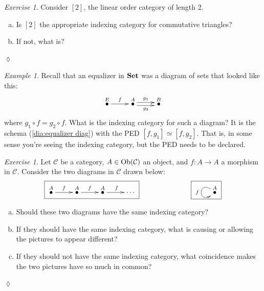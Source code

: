 \documentclass{book}
\def\tn{\textnormal}
\def\mc{\mathcal}
\def\Ob{\tn{Ob}}
\def\to{\rightarrow}
\def\taking{\colon}
\newcommand{\LMO}[1]{\stackrel{#1}{\bullet}}
\def\Set{{\bf Set}}
\def\mcC{\mc{C}}
\theoremstyle{remark}
\newtheorem{example}[subsubsection]{Example}
\newtheorem{exc}[subsubsection]{Exercise}
\newenvironment{exercise}{\begin{exc}}{\hspace*{\fill}$\lozenge$\end{exc}}
\theoremstyle{definition}
\def\sexc{\begin{enumerate}[a.)]\setlength{\itemsep}{.1cm}\setlength{\parskip}{.1cm}\item}
\def\next{\item}
\def\endsexc{\end{enumerate}}
\begin{document}
\begin{exercise}
Consider $[2]$, the linear order category of length 2.
\sexc Is $[2]$ the appropriate indexing category for commutative triangles?
\next If not, what is?
\endsexc
\end{exercise}

\begin{example}

Recall that an equalizer in $\Set$ was a diagram of sets that looked like this:
\begin{align}\label{dia:equalizer diag}
\xymatrix{\LMO{E}\ar[r]^f&\LMO{A}\ar@<.5ex>[r]^{g_1}\ar@<-.5ex>[r]_{g_2}&\LMO{B}}
\end{align}
where $g_1\circ f=g_2\circ f$. What is the indexing category for such a diagram? It is the schema (\ref{dia:equalizer diag}) with the PED $[f,g_1]\simeq[f,g_2]$. That is, in some sense you're seeing the indexing category, but the PED needs to be declared.

\end{example}

\begin{exercise}\label{exc:coincidence}
Let $\mcC$ be a category, $A\in\Ob(\mcC)$ an object, and $f\taking A\to A$ a morphism in $\mcC$. Consider the two diagrams in $\mcC$ drawn below:
$$\fbox{\xymatrix{\LMO{A}\ar[r]^f&\LMO{A}\ar[r]^f&\LMO{A}\ar[r]^f&\cdots}}\hspace{1in}\fbox{\xymatrix{\LMO{A}\ar@(ul,dl)[]_f}}$$
\sexc Should these two diagrams have the same indexing category?
\next If they should have the same indexing category, what is causing or allowing the pictures to appear different?
\next If they should not have the same indexing category, what coincidence makes the two pictures have so much in common?
\endsexc
\end{exercise}
\end{document}
